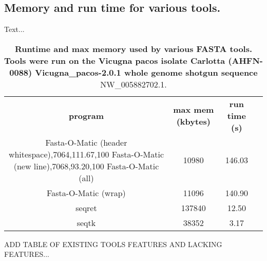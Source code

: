 \subsection{Memory and run time for various tools.}

Text...  

\begin{table}
\begin{center}
\begin{tabular}{cccc}
\hline
 \textbf{program} & \textbf{max mem (kbytes)}  & \textbf{run time (s)}  \\ 
 Fasta-O-Matic (header whitespace),7064,111.67,100
Fasta-O-Matic (new line),7068,93.20,100				  
Fasta-O-Matic (all)          & 10980      & 146.03     \\   
Fasta-O-Matic (wrap)          & 11096      & 140.90     \\ 
seqret          & 137840      & 12.50     \\              
seqtk          & 38352      & 3.17      \\            
\hline
\end{tabular}
\end{center}
\caption{\textbf{Runtime and max memory used by various FASTA tools. Tools were run on the Vicugna pacos isolate Carlotta (AHFN-0088) Vicugna_pacos-2.0.1 whole genome shotgun sequence} NW_005882702.1.}
\end{table}

ADD TABLE OF EXISTING TOOLS FEATURES AND LACKING FEATURES...

  